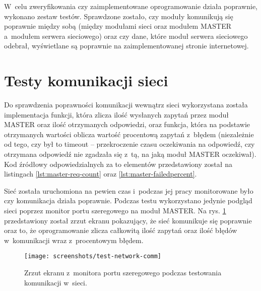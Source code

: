 W~celu zweryfikowania czy zaimplementowane oprogramowanie działa poprawnie, wykonano zestaw testów. Sprawdzone zostało,
czy moduły komunikują się poprawnie między sobą (między modułami sieci oraz modułem MASTER a~modułem serwera sieciowego)
oraz czy dane, które moduł serwera sieciowego odebrał, wyświetlane są poprawnie na zaimplementowanej stronie
internetowej.

\section{\label{sect:test-network-comm}Testy komunikacji sieci} Do sprawdzenia poprawności komunikacji wewnątrz sieci
wykorzystana została implementacja funkcji, która zlicza ilość wysłanych zapytań przez moduł MASTER oraz ilość
otrzymanych odpowiedzi, oraz funkcja, która na podstawie otrzymanych wartości oblicza wartość procentową zapytań z~błędem
(niezależnie od tego, czy był to timeout -- przekroczenie czasu oczekiwania na odpowiedź, czy otrzymana odpowiedź nie
zgadzała się z~tą, na jaką moduł MASTER oczekiwał). Kod źródłowy odpowiedzialnych za to elementów przedstawiony został
na listingach \ref{lst:master-req-count} oraz \ref{lst:master-failedpercent}.





Sieć została uruchomiona na pewien czas i~podczas jej pracy monitorowane było czy komunikacja działa poprawnie. Podczas
testu wykorzystano jedynie podgląd sieci poprzez monitor portu szeregowego na moduł MASTER. Na rys.
\ref{img:test-network-comm} przedstawiony został zrzut ekranu pokazujący, że sieć komunikuje się poprawnie oraz to, że
oprogramowanie zlicza całkowitą ilość zapytań oraz ilość błędów w~komunikacji wraz z~procentowym błędem.

\begin{figure}[!htbp]
    \centering
    \texttt{[image: screenshots/test-network-comm]}
    \caption{\label{img:test-network-comm}Zrzut ekranu z~monitora portu szeregowego podczas testowania komunikacji
        w~sieci.}
\end{figure}

